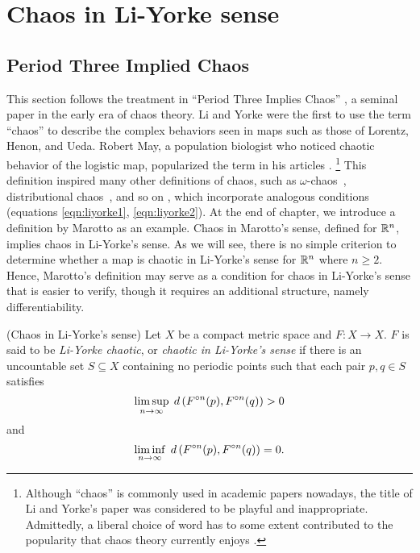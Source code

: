 \documentclass[12pt,draft,twoside]{book}
\begin{document}
\chapter{Chaos in Li-Yorke sense}

\section{Period Three Implied Chaos}
This section follows the treatment in ``Period Three Implies Chaos'' \citep{li-yorke}, a seminal paper in the early era of chaos theory.
Li and Yorke were the first to use the term ``chaos'' to describe the complex behaviors seen in maps such as those of Lorentz, Henon, and Ueda.
Robert May, a population biologist who noticed chaotic behavior of the logistic map, popularized the term in his articles \citeyearpar{may1,may2}.
\footnote{Although ``chaos'' is commonly used in academic papers nowadays, the title of Li and Yorke's paper was considered to be playful and inappropriate.
Admittedly, a liberal choice of word has to some extent contributed to the popularity that chaos theory currently enjoys \citep[``Exploring Chaos on an Interval'']{ueda-abraham}.}
This definition inspired many other definitions of chaos, such as $\omega$-chaos~\citep{omegachaos}, distributional chaos~\citep{dchaos1}, and so on \citep{genericchaos,densechaos,extremechaos}, which incorporate analogous conditions (equations \ref{eqn:liyorke1}, \ref{eqn:liyorke2}).
At the end of chapter, we introduce a definition by Marotto as an example.
Chaos in Marotto's sense, defined for $\mathbb{R}^n$, implies chaos in Li-Yorke's sense.
As we will see, there is no simple criterion to determine whether a map is chaotic in Li-Yorke's sense for $\mathbb{R}^n$ where $n \geq 2$.
Hence, Marotto's definition may serve as a condition for chaos in Li-Yorke's sense that is easier to verify, though it requires an additional structure, namely differentiability.


\begin{definition}
  (Chaos in Li-Yorke's sense)
  Let $X$ be a compact metric space and $F: X\to X$.
  $F$ is said to be \textit{Li-Yorke chaotic}, or 
  \textit{chaotic in Li-Yorke's sense} if there is an uncountable set $S \subseteq X$ containing no
  periodic points such that each pair $p,q \in S$ satisfies
  \begin{equation}
    \limsup\limits_{n \to \infty}\; d\left( F^{\circ n}(p) , F^{\circ n}(q) \right) > 0
    \label{eqn:liyorke1}
  \end{equation}
  and
  \begin{equation}
    \liminf\limits_{n \to \infty}\; d\left( F^{\circ n}(p) , F^{\circ n}(q) \right) = 0.
    \label{eqn:liyorke2}
  \end{equation}
\end{definition}
\end{document}
